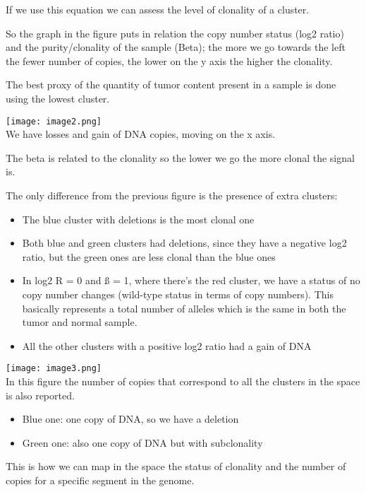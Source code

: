 If we use this equation we can assess the level of clonality of a cluster.

So the graph in the figure puts in relation the copy number status (log2 ratio)
and the purity/clonality of the sample (Beta); the more we go towards the left
the fewer number of copies, the lower on the y axis the higher the clonality.

The best proxy of the quantity of tumor content present in a sample is done
using the lowest cluster.

\texttt{[image: image2.png]}\\

We have losses and
gain of DNA copies, moving on the x axis.

The beta is related to the clonality so the lower we go the more clonal the
signal is.

The only difference from the previous figure is the presence of extra clusters:

\begin{itemize}
\item
  The blue cluster with deletions is the most clonal one
\item
  Both blue and green clusters had deletions, since they have a negative log2
  ratio, but the green ones are less clonal than the blue ones
\item
  In log2 R = 0 and ß = 1, where there's the red cluster, we have a status of no
  copy number changes (wild-type status in terms of copy numbers). This
  basically represents a total number of alleles which is the same in both the
  tumor and normal sample.
\item
  All the other clusters with a positive log2 ratio had a gain of DNA
\end{itemize}

\texttt{[image: image3.png]}\\

In this figure the number of copies that correspond to all the clusters in the
space is also reported.

\begin{itemize}
\item
  Blue one: one copy of DNA, so we have a deletion
\item
  Green one: also one copy of DNA but with subclonality
\end{itemize}

This is how we can map in the space the status of clonality and the number of
copies for a specific segment in the genome.

